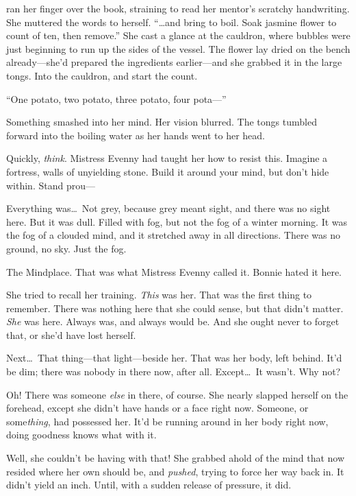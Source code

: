 
 ran her finger over the book, straining to read her mentor's scratchy handwriting.
She muttered the words to herself.
``{\dots}and bring to boil. Soak jasmine flower to count of ten, then remove.''
She cast a glance at the cauldron, where bubbles were just beginning to run up the sides of the vessel.
The flower lay dried on the bench already---she'd prepared the ingredients earlier---and she grabbed it in the large tongs.
Into the cauldron, and start the count.

``One potato, two potato, three potato, four pota---''


Something smashed into her mind.
Her vision blurred.
The tongs tumbled forward into the boiling water as her hands went to her head.

Quickly, \emph{think}.
Mistress Evenny had taught her how to resist this.
Imagine a fortress, walls of unyielding stone.
Build it around your mind, but don't hide within.
Stand prou---


Everything was{\dots}\ Not grey, because grey meant sight, and there was no sight here.
But it was dull.
Filled with fog, but not the fog of a winter morning.
It was the fog of a clouded mind, and it stretched away in all directions.
There was no ground, no sky.
Just the fog.

The Mindplace.
That was what Mistress Evenny called it.
Bonnie hated it here.

She tried to recall her training.
\emph{This} was her.
That was the first thing to remember.
There was nothing here that she could sense, but that didn't matter.
\emph{She} was here.
Always was, and always would be.
And she ought never to forget that, or she'd have lost herself.

Next{\dots}\ That thing---that light---beside her.
That was her body, left behind.
It'd be dim; there was nobody in there now, after all.
Except{\dots}\ It wasn't.
Why not?

Oh!
There was someone \emph{else} in there, of course.
She nearly slapped herself on the forehead, except she didn't have hands or a face right now.
Someone, or some\emph{thing}, had possessed her.
It'd be running around in her body right now, doing goodness knows what with it.

Well, she couldn't be having with that!
She grabbed ahold of the mind that now resided where her own should be, and \emph{pushed}, trying to force her way back in.
It didn't yield an inch.
Until, with a sudden release of pressure, it did.

